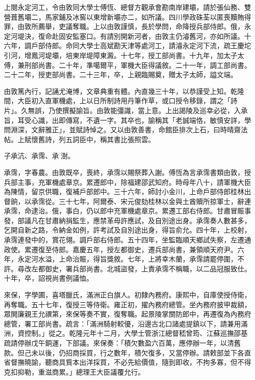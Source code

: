 \begin{pinyinscope}
上閱永定河工，令由敦同大學士傅恆、總督方觀承會勘南岸建壩，請於張仙務、雙營葺舊壩二，馬家鋪及冰窖以東增新壩亦二，如所議。四川學政硃荃以匿喪黷賄得罪，由敦所薦舉，吏議奪職。上以由敦謹慎，長於學問，命降授兵部侍郎。俄，永定河堤決，復命赴固安監塞口。有請別開新河者，由敦主仍濬舊河，亦如所議。十六年，調戶部侍郎。命同大學士高斌勘天津等處河工，請濬永定河下流，疏王慶坨引河，增鳳河堤壩，培東岸堤障東澱。十七年，授工部尚書。十九年，加太子太傅，兼刑部尚書。二十年，準噶爾平，軍機大臣得議敘。二十一年，調工部尚書。二十二年，授吏部尚書。二十三年，卒，上親臨賜奠，贈太子太師，謚文端。

由敦篤內行，記誦尤淹博，文章典重有體。內直幾三十年，以恭謹受上知。乾隆間，大臣初入直軍機處，上以日所制詩用丹筆作草，或口授令移錄，謂之「詩片」。久無誤，乃使撰擬諭旨。由敦能彊識，當上意。上出謁陵及巡幸必從，入承旨，耳受心識，出即傳寫，不遺一字。其卒也，諭稱其「老誠端恪，敏慎安詳，學問淵深，文辭雅正」，並賦詩悼之。又以由敦善書，命館臣排次上石，曰時晴齋法帖。上賦懷舊詩，列五詞臣中，稱其書比張照雲。

子承沆、承霈、承澍。

承霈，字春農。由敦既卒，喪終，承霈以賜祭葬入謝。傅恆為言承霈書類由敦，授兵部主事，充軍機處章京。累遷郎中，除福建邵武知府。時母年八十，請軍機大臣為陳情，留京供職，復補戶部郎中。三十六年，師討小金川，上命戶部侍郎桂林出督餉，以承霈從。三十七年，阿爾泰、宋元俊劾桂林以金與土酋贖所掠軍士，辭連承霈，命逮治。俄，事白，仍以郎中充軍機處章京。累遷工部右侍郎。甘肅冒賑事發，部議凡在甘肅納捐監生，應禁革毋許應試，及自別途出身。承霈奏人數甚多，乞開自新之路，令納金如例，許考試及自別途出身，得旨俞允。四十年，上校射，承霈連發中的，賞花翎。調戶部右侍郎。五十四年，坐監臨順天鄉試失察，左遷通政使。累遷復至侍郎。嘉慶五年，授左都御史，遷兵部尚書，兼領順天府尹。六年，永定河水溢，上命治賑，得旨獎敘。七年，上將幸木蘭，承霈請罷停圍，不許。尋改左都御史，署兵部尚書。北城盜發，上責承霈不稱職，以二品冠服致仕。十年，卒，詔視尚書例議恤。

來保，字學圃，喜塔臘氏，滿洲正白旗人。初隸內務府。康熙中，自庫使授侍衛，再奪職。五十七年，復授三等侍衛。雍正初，擢內務府總管。坐內務府披甲裁額，眾閧廉親王允禩第，來保等奏不實，復奪職。起景陵掌關防郎中，再遷復為內務府總管，署工部尚書。疏言：「滿洲騎射較優，沿邊古北口諸處提鎮以下，請兼用滿洲，資控制。」從之。乾隆元年十二月，大學士管浙江總督嵇曾筠、江蘇巡撫邵基疏請停辦戊午銅運，下部議。來保奏：「積欠數盈六百萬，應停辦一年，以清舊款。但己未以後，仍招商採買，行之數年，積欠復多，又當停辦。請敕部並下各直省督撫曉諭，聽商具貲本出洋採買，不必先給價值，隨到即收，不拘多寡，但不得克扣抑勒，重滋商累。」總理王大臣議覆允行。


\end{pinyinscope}
